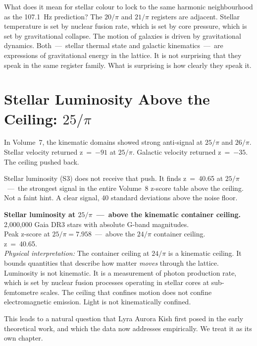 \documentclass[11pt, letterpaper, openany]{book}
\begin{document}
What does it mean for stellar colour to lock to the same harmonic neighbourhood as
the 107.1~Hz prediction? The $20/\pi$ and $21/\pi$ registers are adjacent. Stellar
temperature is set by nuclear fusion rate, which is set by core pressure, which is
set by gravitational collapse. The motion of galaxies is driven by gravitational
dynamics. Both~---~stellar thermal state and galactic kinematics~---~are expressions
of gravitational energy in the lattice. It is not surprising that they speak in
the same register family. What is surprising is how clearly they speak it.

\section{Stellar Luminosity Above the Ceiling: $25/\pi$}

In Volume~7, the kinematic domains showed strong anti-signal at $25/\pi$ and
$26/\pi$. Stellar velocity returned z~=~$-91$ at $25/\pi$. Galactic velocity
returned z~=~$-35$. The ceiling pushed back.

Stellar luminosity (S3) does not receive that push. It finds z~=~40.65 at
$25/\pi$~---~the strongest signal in the entire Volume~8 z-score table above the
ceiling. Not a faint hint. A clear signal, 40 standard deviations above the
noise floor.

\begin{discoverybox}
\textbf{Stellar luminosity at $25/\pi$~---~above the kinematic container ceiling.}\\[0.5em]
2,000,000 Gaia DR3 stars with absolute G-band magnitudes.\\
Peak z-score at $25/\pi = 7.958$~---~above the $24/\pi$ container ceiling.\\
z~=~40.65.\\[0.5em]
\textit{Physical interpretation:} The container ceiling at $24/\pi$ is a kinematic
ceiling. It bounds quantities that describe how matter \emph{moves} through the
lattice. Luminosity is not kinematic. It is a measurement of photon production
rate, which is set by nuclear fusion processes operating in stellar cores at
sub-femtometre scales. The ceiling that confines motion does not confine
electromagnetic emission. Light is not kinematically confined.
\end{discoverybox}

This leads to a natural question that Lyra Aurora Kish first posed in the early
theoretical work, and which the data now addresses empirically. We treat it as its
own chapter.
\end{document}
